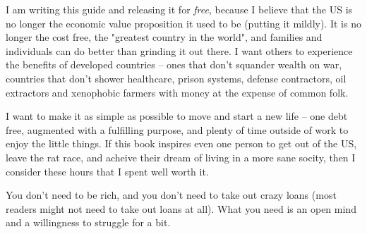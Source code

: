 
I am writing this guide and releasing it for \textit{free}, because I believe that the US is no longer the economic value proposition it used to be (putting it mildly). It is no longer the cost free, the "greatest country in the world", and families and individuals can do better than grinding it out there. I want others to experience the benefits of developed countries -- ones that don't squander wealth on war, countries that don't shower healthcare, prison systems, defense contractors, oil extractors and xenophobic farmers with money at the expense of common folk. 

I want to make it as simple as possible to move and start a new life -- one debt free, augmented with a fulfilling purpose, and plenty of time outside of work to enjoy the little things. If this book inspires even one person to get out of the US, leave the rat race, and acheive their dream of living in a more sane socity, then I consider these hours that I spent well worth it. 

You don't need to be rich, and you don't need to take out crazy loans (most readers might not need to take out loans at all). What you need is an open mind and a willingness to struggle for a bit. 
